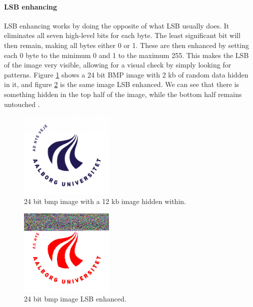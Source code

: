 
\paragraph*{LSB enhancing}
LSB enhancing works by doing the opposite of what LSB usually does.
It eliminates all seven high-level bits for each byte. 
The least significant bit will then remain, making all bytes either 0 or 1.
These are then enhanced by setting each 0 byte to the minimum 0 and 1 to the maximum 255.
This makes the LSB of the image very visible, allowing for a visual check by simply looking for patterns.
Figure \ref{fig:hiddenAAU} shows a 24 bit BMP image with 2 kb of random data hidden in it, and figure \ref{fig:LSBenhanced} is the same image LSB enhanced.
We can see that there is something hidden in the top half of the image, while the bottom half remains untouched \citep{Westfeld2000}.

\begin{figure}
	\centering
	\includegraphics[width=0.4\textwidth]{figures/StegoAAU.png}
	\caption{24 bit bmp image with a 12 kb image hidden within.}
	\label{fig:hiddenAAU}
\end{figure}

\begin{figure}
	\centering
	\includegraphics[width=0.4\textwidth]{figures/StegoAAULSB.png}
	\caption{24 bit bmp image LSB enhanced.}
	\label{fig:LSBenhanced}
\end{figure}

